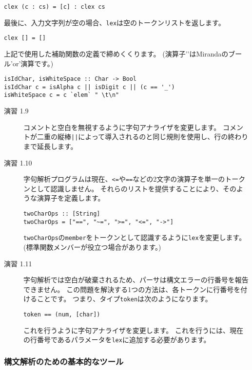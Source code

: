 \documentclass{jarticle}
\begin{document}
\begin{verbatim}
clex (c : cs) = [c] : clex cs
\end{verbatim}

最後に、入力文字列が空の場合、\texttt{lex}は空のトークンリストを返します。

\begin{verbatim}
clex [] = []
\end{verbatim}

上記で使用した補助関数の定義で締めくくります。
(演算子'\texttt{\/}'はMirandaのブール'or'演算です。)

\begin{verbatim}
isIdChar, isWhiteSpace :: Char -> Bool
isIdChar c = isAlpha c || isDigit c || (c == '_')
isWhiteSpace c = c `elem` " \t\n"
\end{verbatim}

\begin{description}
	\item[演習 1.9] コメントと空白を無視するように字句アナライザを変更します。
		コメントが二重の縦棒\texttt{||}によって導入されるのと同じ規則を使用し、行の終わりまで延長します。
	\item[演習 1.10] 字句解析プログラムは現在、\texttt{<=}や\texttt{==}などの2文字の演算子を単一のトークンとして認識しません。
		それらのリストを提供することにより、そのような演算子を定義します。

		\begin{verbatim}
twoCharOps :: [String]
twoCharOps = ["==", "~=", ">=", "<=", "->"]
\end{verbatim}

		\texttt{twoCharOps}の\texttt{member}をトークンとして認識するように\texttt{lex}を変更します。
		(標準関数メンバーが役立つ場合があります。)
	\item[演習 1.11] 字句解析では空白が破棄されるため、パーサは構文エラーの行番号を報告できません。
		この問題を解決する1つの方法は、各トークンに行番号を付けることです。
		つまり、タイプ\texttt{token}は次のようになります。

		\begin{verbatim}
token == (num, [char])
\end{verbatim}

		これを行うように字句アナライザを変更します。
		これを行うには、現在の行番号であるパラメータを\texttt{lex}に追加する必要があります。
\end{description}

\subsubsection{構文解析のための基本的なツール}
\end{document}
